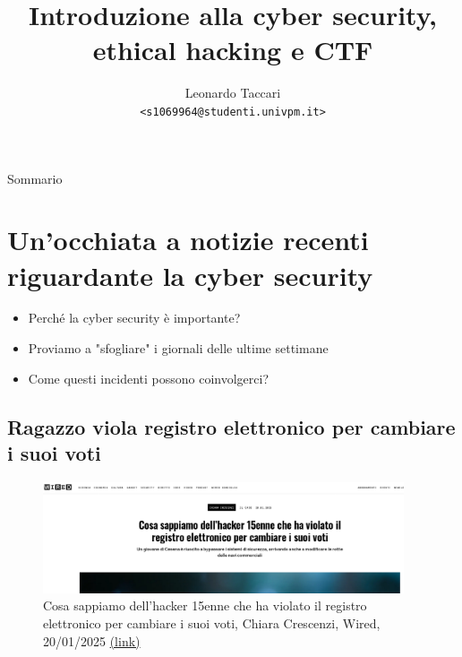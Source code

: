 \documentclass{beamer}
\title{Introduzione alla cyber security, ethical hacking e CTF}
\author[leot]{Leonardo Taccari \\ {\footnotesize \texttt{<s1069964@studenti.univpm.it>}}}
\date{}
\begin{document}
\begin{frame}
\maketitle
\end{frame}

\begin{frame}{Sommario}
\tableofcontents
\end{frame}

\section*{Un'occhiata a notizie recenti riguardante la cyber security}
\begin{frame}{\insertsection}
\begin{itemize}
\item Perché la cyber security è importante?
\item Proviamo a "sfogliare" i giornali delle ultime settimane
\item Come questi incidenti possono coinvolgerci?
\end{itemize}
\end{frame}

\subsection*{Ragazzo viola registro elettronico per cambiare i suoi voti}
\begin{frame}{\insertsection}{\insertsubsection}
\begin{figure}
\includegraphics[width=0.95\textwidth]{imgs/news-wired-hacker-15enne.png}
\caption{Cosa sappiamo dell'hacker 15enne che ha violato il registro elettronico
per cambiare i suoi voti, Chiara Crescenzi, Wired, 20/01/2025
\href{https://www.wired.it/article/hacker-15enne-voti-scolastici/}{(link)}}
\end{figure}
\end{frame}
\end{document}
